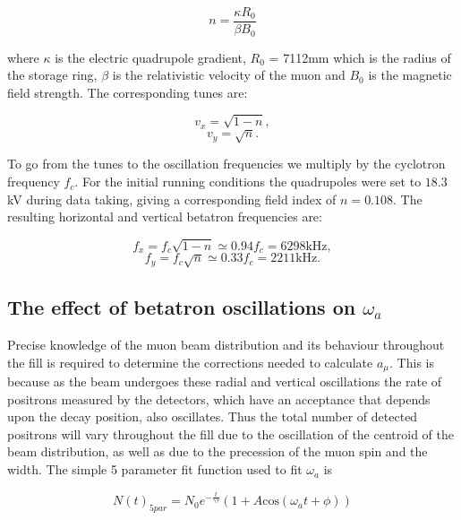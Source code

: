 \begin{equation}
n=\frac{{\kappa}R_{0}}{{\beta}B_{0}}
\end{equation}

\noindent
where $\kappa$ is the electric quadrupole gradient, $R_{0}$ = 7112mm which is the radius of the storage ring, $\beta$ is the relativistic velocity of the muon and $B_{0}$ is the magnetic field strength. The corresponding tunes are:

\begin{equation}
v_{x} = {\sqrt{1-n}},
\end{equation}
\begin{equation}
v_{y} = \sqrt{n}.
\end{equation}

To go from the tunes to the oscillation frequencies we multiply by the cyclotron frequency $f_{c}$. For the initial running conditions the quadrupoles were set to $18.3$ kV during data taking, giving a corresponding field index of $n = 0.108$. The resulting horizontal and vertical betatron frequencies are:

\begin{equation}
{f_{x} = f_{c}\sqrt{1-n} \simeq 0.94f_{c}} = 6298\mathrm{ kHz},
\end{equation}
\begin{equation}
{f_{y} = f_{c}\sqrt{n} \simeq 0.33f_{c}} = 2211\mathrm{ kHz}.
\end{equation}

\subsection{The effect of betatron oscillations on $\omega_{a}$}

Precise knowledge of the muon beam distribution and its behaviour throughout the fill is required to determine the corrections needed to calculate $a_{\mu}$. This is because as the beam undergoes these radial and vertical oscillations the rate of positrons measured by the detectors, which have an acceptance that depends upon the decay position, also oscillates. Thus the total number of detected positrons will vary throughout the fill due to the oscillation of the centroid of the beam distribution, as well as due to the precession of the muon spin and the width. The simple 5 parameter fit function used to fit $\omega_{a}$ is 

\begin{equation}
N(t)_{5par} = N_{0}e^{-\frac{t}{\gamma\tau}}(1+A\mathrm{cos}(\omega_{a}t + \phi))
\end{equation}

